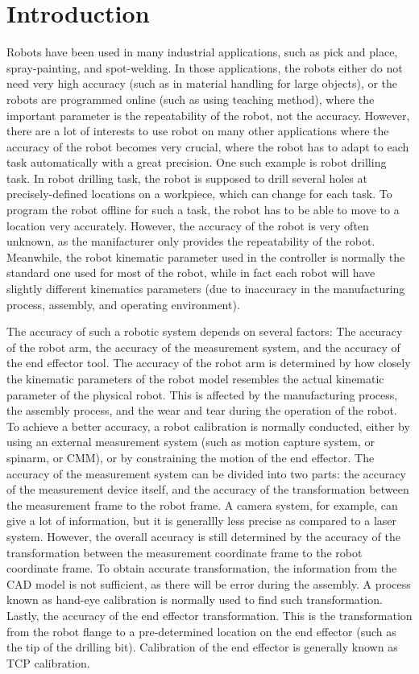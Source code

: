 \section{Introduction}
\label{sec:introduction}

Robots have been used in many industrial applications, such as pick and place, spray-painting, and spot-welding. In those applications, the robots either do not need very high accuracy (such as in material handling for large objects), or the robots are programmed online (such as using teaching method), where the important parameter is the repeatability of the robot, not the accuracy. However, there are a lot of interests to use robot on many other applications where the accuracy of the robot becomes very crucial, where the robot has to adapt to each task automatically with a great precision. One such example is robot drilling task. 
In robot drilling task, the robot is supposed to drill several holes at precisely-defined locations on a workpiece, which can change for each task. To program the robot offline for such a task, the robot has to be able to move to a location very accurately. However, the accuracy of the robot is very often unknown, as the manifacturer only provides the repeatability of the robot. Meanwhile, the robot kinematic parameter used in the controller is normally the standard one used for most of the robot, while in fact each robot will have slightly different kinematics parameters (due to inaccuracy in the manufacturing process, assembly, and operating environment). 

The accuracy of such a robotic system depends on several factors: The accuracy of the robot arm, the accuracy of the measurement system, and the accuracy of the end effector tool. The accuracy of the robot arm is determined by how closely the kinematic parameters of the robot model resembles the actual kinematic parameter of the physical robot. This is affected by the manufacturing process, the assembly process, and the wear and tear during the operation of the robot. To achieve a better accuracy, a robot calibration is normally conducted, either by using an external measurement system (such as motion capture system, or spinarm, or CMM), or by constraining the motion of the end effector. 
The accuracy of the measurement system can be divided into two parts: the accuracy of the measurement device itself, and the accuracy of the transformation between the measurement frame to the robot frame. A camera system, for example, can give a lot of information, but it is generallly less precise as compared to a laser system. However, the overall accuracy is still determined by the accuracy of the transformation between the measurement coordinate frame to the robot coordinate frame. To obtain accurate transformation, the information from the CAD model is not sufficient, as there will be error during the assembly. A process known as hand-eye calibration is normally used to find such transformation. 
Lastly, the accuracy of the end effector transformation. This is the transformation from the robot flange to a pre-determined location on the end effector (such as the tip of the drilling bit). Calibration of the end effector is generally known as TCP calibration. 

